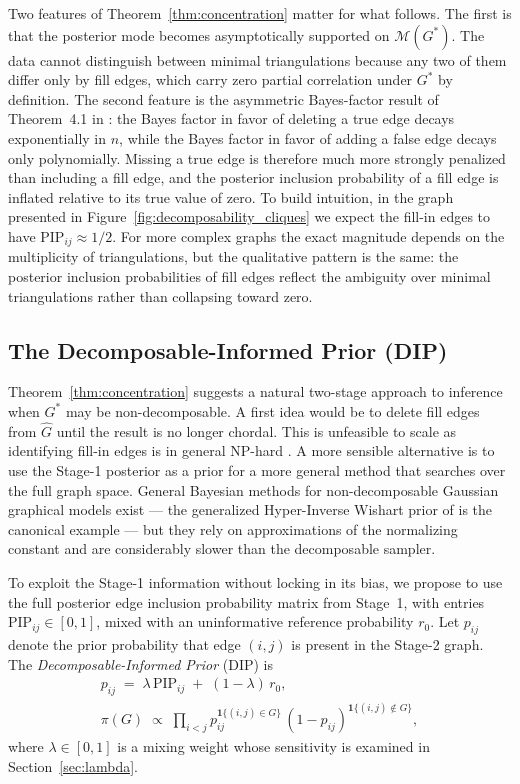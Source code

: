 Two features of Theorem~\ref{thm:concentration} matter for what follows. The first is that the posterior mode becomes asymptotically supported on $\mathcal{M}(G^*)$. The data cannot distinguish between minimal triangulations because any two of them differ only by fill edges, which carry zero partial correlation under $G^*$ by definition. The second feature is the asymmetric Bayes-factor result of Theorem~4.1 in \textcite{niu2020bayesian}: the Bayes factor in favor of deleting a true edge decays exponentially in $n$, while the Bayes factor in favor of adding a false edge decays only polynomially. Missing a true edge is therefore much more strongly penalized than including a fill edge, and the posterior inclusion probability of a fill edge is inflated relative to its true value of zero. To build intuition, in the graph presented in Figure~\ref{fig:decomposability_cliques} we expect the fill-in edges to have $\text{PIP}_{ij} \approx 1/2$. For more complex graphs the exact magnitude depends on the multiplicity of triangulations, but the qualitative pattern is the same: the posterior inclusion probabilities of fill edges reflect the ambiguity over minimal triangulations rather than collapsing toward zero.

\subsection{The Decomposable-Informed Prior (DIP)}

Theorem~\ref{thm:concentration} suggests a natural two-stage approach to inference when $G^*$ may be non-decomposable. A first idea would be to delete fill edges from $\hat G$ until the result is no longer chordal. This is unfeasible to scale as identifying fill-in edges is in general NP-hard \parencite{yannakakis1981computing}. A more sensible alternative is to use the Stage-1 posterior as a prior for a more general method that searches over the full graph space. General Bayesian methods for non-decomposable Gaussian graphical models exist --- the generalized Hyper-Inverse Wishart prior of \textcite{mohammadi2015bdgraph} is the canonical example --- but they rely on approximations of the normalizing constant and are considerably slower than the decomposable sampler.

To exploit the Stage-1 information without locking in its bias, we propose to use the full posterior edge inclusion probability matrix from Stage~1, with entries $\text{PIP}_{ij} \in [0,1]$, mixed with an uninformative reference probability $r_0$. Let $p_{ij}$ denote the prior probability that edge $(i,j)$ is present in the Stage-2 graph. The \textit{Decomposable-Informed Prior} (DIP) is
\begin{equation*}
    \begin{gathered}
        p_{ij} \;=\; \lambda\,\text{PIP}_{ij} \;+\; (1-\lambda)\, r_0, \\
        \pi(G) \;\propto\; \prod_{i < j} p_{ij}^{\mathbf{1}\{(i,j)\in G\}} \, (1 - p_{ij})^{\mathbf{1}\{(i,j) \notin G\}},
    \end{gathered}
\end{equation*}
where $\lambda \in [0,1]$ is a mixing weight whose sensitivity is examined in Section~\ref{sec:lambda}.

